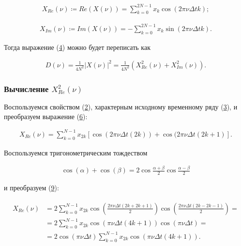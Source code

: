 \documentclass[12pt]{article}
\newcommand{\hl}[1]{(\hyperlink{eq:#1}{#1})}
\newcommand{\s}[2]{\hypertarget{skip:#1}{\vspace{#2pt}}}
\newcommand{\sd}[1]{\hypertarget{skip:#1}{\vspace{-10pt}}}
\newcommand{\hep}[2]{\vspace{#2pt}\hypertarget{eq:#1}{}\vspace{-#2pt}}
\newcommand{\hs}[1]{\sd{#1}\hep{#1}{18}}
\newcommand{\hst}[1]{\sd{#1}\hep{#1}{22}}
\begin{document}
\vspace{-37pt}\hep{6}{20}
\begin{gather}
    X_{Re}(\nu) \coloneqq {Re}(X(\nu)) = \sum_{k = 0}^{2 N - 1} x_k \cos(2 \pi \nu \Delta t k);
\end{gather}

\s{7}{-20}
\begin{gather}
    X_{Im}(\nu) \coloneqq {Im}(X(\nu)) = - \sum_{k = 0}^{2 N - 1} x_k \sin(2 \pi \nu \Delta t k).
\end{gather}

Тогда выражение \hl{4} можно будет переписать как

\hs{8}
\begin{gather}
    D(\nu) = \frac{1}{4 N^2} | X(\nu) |^2 = \frac{1}{4 N^2} (X_{Re}^2(\nu) + X_{Im}^2(\nu)).
\end{gather}

\subsubsection{Вычисление $ X_{Re}^2(\nu) $}

Воспользуемся свойством \hl{2}, характерным исходному временному ряду \hl{3}, и преобразуем выражение \hl{6}:

\hst{9}
\begin{gather}
    X_{Re}(\nu) = \sum_{k = 0}^{N - 1} x_{2 k} [ \cos(2 \pi \nu \Delta t (2 k)) + \cos(2 \pi \nu \Delta t (2 k + 1) ].
\end{gather}

Воспользуемся тригонометрическим тождеством

\sd{10}
\begin{gather}
    \cos(\alpha) + \cos(\beta) = 2 \cos \frac{\alpha + \beta}{2} \cos \frac{\alpha - \beta}{2}
\end{gather}

и преобразуем \hl{9}:

\hst{11}
\begin{gather}
\begin{split}
    X_{Re}(\nu) &= 2 \sum_{k = 0}^{N - 1} x_{2 k} \cos\left( \frac{2 \pi \nu \Delta t (2k + 2k + 1)}{2} \right) \cos\left( \frac{2 \pi \nu \Delta t (2 k - 2 k - 1) }{2} \right) = \\
    &= 2 \sum_{k = 0}^{N - 1} x_{2 k} \cos( \pi \nu \Delta t (4k + 1) ) \cos( \pi \nu \Delta t) = \\
    &= 2 \cos( \pi \nu \Delta t) \sum_{k = 0}^{N - 1} x_{2 k} \cos( \pi \nu \Delta t (4k + 1) ).
\end{split}
\end{gather}
\end{document}
